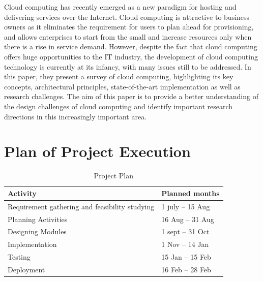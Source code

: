 \documentclass[oneside,a4paper,12pt]{report}
\begin{document}
\begin{enumerate}
Cloud computing has recently emerged as a new paradigm for hosting and delivering services over the Internet. Cloud computing is attractive to business owners as it eliminates the requirement for users to plan ahead for provisioning, and allows enterprises to start from the small and increase resources only when there is a rise in service demand. However, despite the fact that cloud computing offers huge opportunities to the IT industry, the development of cloud computing technology is currently at its infancy, with many issues still to be addressed. In this paper, they present a survey of cloud computing, highlighting its key concepts, architectural principles, state-of-the-art implementation as well as research challenges. The aim of this paper is to provide a better understanding of the design challenges of cloud computing and identify important research directions in this increasingly important area.\\
\end{enumerate}   

\section{Plan of Project Execution}

\begin{table}[!htbp]
\begin{center}
\def\arraystretch{1.5}
\begin{tabularx}{\textwidth}{| X | X |}
\hline
Activity	& Planned months\\
\hline
Requirement gathering and feasibility studying        &1 july – 15 Aug\\
\hline
Planning Activities       &16 Aug – 31 Aug\\
\hline
Designing Modules        &1 sept – 31 Oct\\
\hline
Implementation           &1 Nov – 14 Jan\\
\hline
Testing                  &15 Jan – 15 Feb\\
\hline
Deployment               &16 Feb – 28 Feb\\
\hline



\end{tabularx}
\end{center}
\caption{Project Plan}
\label{tab:usecase}
\end{table}
\end{document}
